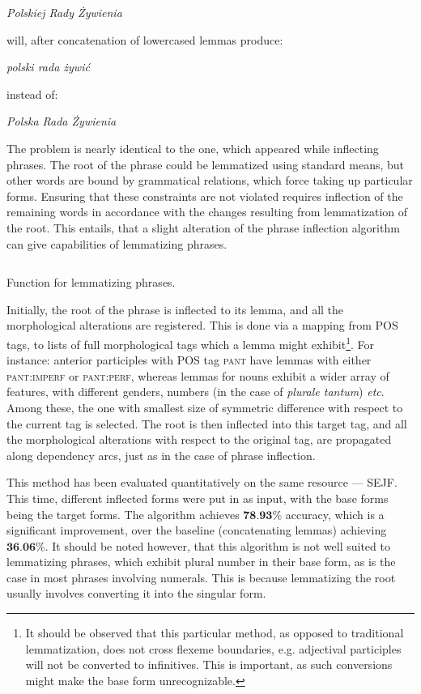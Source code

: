 \documentclass[12pt]{article}
\newcommand{\gloss}[1]{\vspace{10pt}\indent\textit{#1}\vspace{5pt}}
\begin{document}
\gloss{Polskiej Rady Żywienia}

\noindent will, after concatenation of lowercased lemmas produce:

\gloss{polski rada żywić}

\noindent instead of:

\gloss{Polska Rada Żywienia}

The problem is nearly identical to the one, which appeared while inflecting phrases. The root of the phrase could be lemmatized using standard means, but other words are bound by grammatical relations, which force taking up particular forms. Ensuring that these constraints are not violated requires inflection of the remaining words in accordance with the changes resulting from lemmatization of the root. This entails, that a slight alteration of the phrase inflection algorithm can give capabilities of lemmatizing phrases.

\begin{listing}[htbp]
\inputminted[linenos,tabsize=2,breaklines]{Python}{lemmatization_snippet.py}
\caption{Function for lemmatizing phrases.}
\label{lst:lemmatization_flex}
\end{listing}

Initially, the root of the phrase is inflected to its lemma, and all the morphological alterations are registered. This is done via a mapping from POS tags, to lists of full morphological tags which a lemma might exhibit\footnote{It should be observed that this particular method, as opposed to traditional lemmatization, does not cross flexeme boundaries, e.g. adjectival participles will not be converted to infinitives. This is important, as such conversions might make the base form unrecognizable.}. For instance: anterior participles with POS tag \textsc{pant} have lemmas with either \textsc{pant:imperf} or \textsc{pant:perf}, whereas lemmas for nouns exhibit a wider array of features, with different genders, numbers (in the case of \textit{plurale tantum}) \textit{etc}. Among these, the one with smallest size of symmetric difference with respect to the current tag is selected. The root is then inflected into this target tag, and all the morphological alterations with respect to the original tag, are propagated along dependency arcs, just as in the case of phrase inflection.

This method has been evaluated quantitatively on the same resource --- SEJF. This time, different inflected forms were put in as input, with the base forms being the target forms. The algorithm achieves $\textbf{78.93\%}$ accuracy, which is a significant improvement, over the baseline (concatenating lemmas) achieving $\textbf{36.06\%}$. It should be noted however, that this algorithm is not well suited to lemmatizing phrases, which exhibit plural number in their base form, as is the case in most phrases involving numerals. This is because lemmatizing the root usually involves converting it into the singular form.
\end{document}
